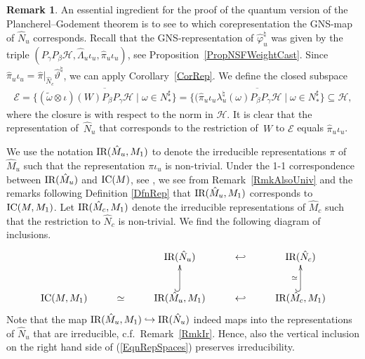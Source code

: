 \documentclass[11pt]{article}
\numberwithin{equation}{section}
\theoremstyle{definition}
\newtheorem{rmk}[thm]{Remark}
\newcommand{\cHil}{\mathcal{H}}
\newcommand{\ICM}{\text{\rm IC}(M)}
\newcommand{\ICMM}{\text{\rm IC}(M, M_1)}
\newcommand{\IR}{\text{\rm IR}}
\begin{document}
\begin{rmk}\label{RmkGNSCorrespondence}
An essential ingredient for the proof of the quantum version of the Plancherel--Godement theorem is to see to which corepresentation the GNS-map of  $\hat{N}_u$ corresponds.  Recall that the GNS-representation of $\hat{\varphi}_{u}^\natural$ was given by the triple $(P_\gamma P_\beta \cHil, \hat{\Lambda}_u \iota_u, \hat{\pi}_u \iota_u)$, see Proposition~\ref{PropNSFWeightCast}. Since $\hat{\pi}_u \iota_u = \hat{\pi}\vert_{\hat{N}_c} \hat{\vartheta}^\natural$, we can apply Corollary~\ref{CorRep}.  We def\/ine the closed subspace
\begin{gather}\label{EqnSpaceK}
\mathcal{E} = \overline{\{ (\tilde{\omega} \otimes \iota)(W)  P_\beta P_\gamma \cHil  \mid \omega \in N_\ast^\sharp \}} = \overline{\{ ( \hat{\pi}_u \iota_u \lambda_u^\natural(\omega)  P_\beta P_\gamma \cHil  \mid \omega \in N_\ast^\sharp \}} \subseteq \cHil,
\end{gather}
where the closure is with respect to the norm in $\cHil$. It is clear that the representation of~$\hat{N}_u$ that corresponds to the restriction of~$W$ to $\mathcal{E}$ equals  $\hat{\pi}_u \iota_u$.
\end{rmk}

We use the notation $\IR(\hat{M}_u, M_1)$ to denote the irreducible representations $\pi$ of $\hat{M}_u$ such that the representation $\pi \iota_u$ is non-trivial. Under the 1-1 correspondence between $\IR(\hat{M}_u)$ and $\ICM$, see \cite{Kus}, we see from Remark~\ref{RmkAlsoUniv} and the remarks following Def\/inition \ref{DfnRep} that $\IR(\hat{M}_u, M_1)$ corresponds to $\ICMM$. Let $\IR(\hat{M}_c, M_1)$ denote the irreducible representations   of $\hat{M}_c$ such that the restriction to $\hat{N}_c$ is non-trivial. We f\/ind the following diagram of inclusions.
\begin{gather}\label{EqnRepSpaces}
\xymatrix{
&&\IR(\hat{N}_u)  & \hookleftarrow & \IR(\hat{N}_c) \\
\ICMM& \simeq&\IR(\hat{M}_u, M_1) \ar@{^{(}->}[u] & \hookleftarrow & \IR(\hat{M}_c, M_1)  \ar@{^{(}->}[u]^\simeq
}
\end{gather}
Note that the map $\IR(\hat{M}_u, M_1) \hookrightarrow \IR(\hat{N}_u)$ indeed maps into the representations of $\hat{N}_u$ that are irreducible, c.f.\ Remark~\ref{RmkIr}. Hence, also the vertical inclusion on the right hand side of (\ref{EqnRepSpaces}) preserves irreducibility.
\end{document}
